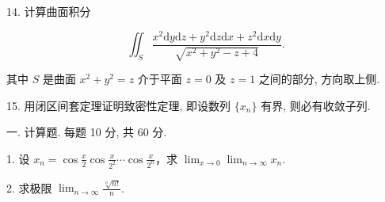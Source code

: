 \documentclass{examcollection}
\renewcommand{\displayformula}[1]{\[#1\]}
\begin{document}
{\begin{minipage}{\textwidth}
14. 计算曲面积分\par
\displayformula{\iint_ {S} \frac {x ^ {2} \mathrm{d} y \mathrm{d} z + y ^ {2} \mathrm{d} z \mathrm{d} x + z ^ {2} \mathrm{d} x \mathrm{d} y}{\sqrt {x ^ {2} + y ^ {2} - z + 4}}.}\par
其中 $S$ 是曲面 $x^{2} + y^{2} = z$ 介于平面 $z = 0$ 及 $z = 1$ 之间的部分, 方向取上侧.\par
15. 用闭区间套定理证明致密性定理, 即设数列 $\{x_{n}\}$ 有界, 则必有收敛子列.\par
{}\smallskip
一. 计算题. 每题 10 分, 共 60 分.\par
1. 设 $x_{n} = \cos \frac{x}{2} \cos \frac{x}{2^{2}} \cdots \cos \frac{x}{2^{n}}$，求 $\lim_{x \to 0} \lim_{n \to \infty} x_{n}$.\par
2. 求极限 $\lim_{n\to \infty}\frac{\sqrt[n]{n!}}{n}$.\par
\end{minipage}}
\ifdim\dimexpr\ht\proofbox+\dp\proofbox\relax>\textheight
\noindent\resizebox{!}{\textheight}{\usebox{\proofbox}}\else\noindent\usebox{\proofbox}\fi\clearpage
\end{document}
